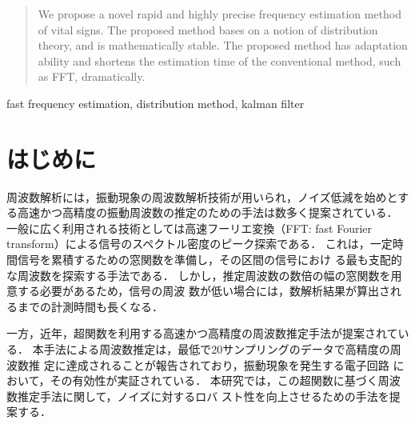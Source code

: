 \documentclass[usejistfm]{sice}
\begin{document}
\jsubtitle{}
\esubtitle{}



\begin{abstract}
 We propose a novel rapid and highly precise frequency estimation
 method of vital signs.
 The proposed method bases on a notion of distribution theory, and  
 is mathematically stable.  
 The proposed method has adaptation ability and shortens the estimation
 time of the conventional method, such as FFT, dramatically. 
\end{abstract}
\begin{keywords}
 fast frequency estimation, distribution method, kalman filter
\end{keywords}
\maketitle

\section{はじめに}
%
周波数解析には，振動現象の周波数解析技術が用いられ，ノイズ低減を始めとす
る高速かつ高精度の振動周波数の推定のための手法は数多く提案されている．
%
一般に広く利用される技術としては高速フーリエ変換（FFT: fast Fourier
transform）による信号のスペクトル密度のピーク探索である．
%
これは，一定時間信号を累積するための窓関数を準備し，その区間の信号におけ
る最も支配的な周波数を探索する手法である．
%
しかし，推定周波数の数倍の幅の窓関数を用意する必要があるため，信号の周波
数が低い場合には，数解析結果が算出されるまでの計測時間も長くなる．

一方，近年，超関数を利用する高速かつ高精度の周波数推定手法が提案されてい
る\cite{SF}．
%
本手法による周波数推定は，最低で20サンプリングのデータで高精度の周波数推
定に達成されることが報告されており\cite{SF}，振動現象を発生する電子回路
において，その有効性が実証されている．
%
本研究では，この超関数に基づく周波数推定手法に関して，ノイズに対するロバ
スト性を向上させるための手法を提案する．
\end{document}
